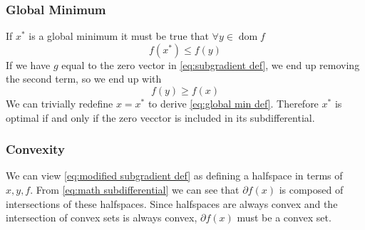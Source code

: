 \documentclass[journal,onecolumn]{IEEEtran}
\DeclareMathOperator{\dom}{dom}
\begin{document}
\subsubsection{Global Minimum}
If \(x^*\) is a global minimum it must be true that \(\forall y \in \dom f\)
\begin{equation}\label{eq:global min def}
f(x^*) \leq f(y)
\end{equation}
If we have \(g\) equal to the zero vector in \eqref{eq:subgradient def}, we end up removing the second term, so we end up with
\begin{equation}\label{eq:zero vector subgradient}
f(y) \geq f(x)
\end{equation}
We can trivially redefine \(x = x^*\) to derive \eqref{eq:global min def}. Therefore \(x^*\) is optimal if and only if the zero vecctor is included in its subdifferential.

\subsubsection{Convexity}
We can view \eqref{eq:modified subgradient def} as defining a halfspace in terms of \(x, y, f\). From \eqref{eq:math subdifferential} we can see that \(\partial f(x)\) is composed of intersections of these halfspaces. Since halfspaces are always convex and the intersection of convex sets is always convex, \(\partial f(x)\) must be a convex set.



\end{document}
